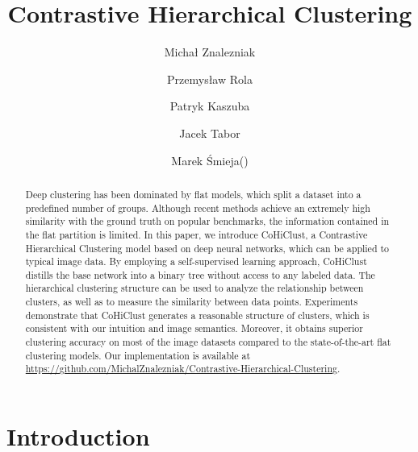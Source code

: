 \documentclass[runningheads]{llncs}
\def\our{CoHiClust}
\begin{document}
\title{Contrastive Hierarchical Clustering}




\author{Micha\l{} Znalezniak \and
Przemys\l{}aw Rola \and
Patryk Kaszuba \and 
Jacek Tabor \and
Marek Śmieja(\Letter)}
\maketitle              \begin{abstract}
Deep clustering has been dominated by flat models, which split a dataset into a predefined number of groups. Although recent methods achieve an extremely high similarity with the ground truth on popular benchmarks, the information contained in the flat partition is limited. In this paper, we introduce \our{}, a Contrastive Hierarchical Clustering model based on deep neural networks, which can be applied to typical image data. By employing a self-supervised learning approach, \our{} distills the base network into a binary tree without access to any labeled data. The hierarchical clustering structure can be used to analyze the relationship between clusters, as well as to measure the similarity between data points. Experiments demonstrate that \our{} generates a reasonable structure of clusters, which is consistent with our intuition and image semantics. Moreover, it obtains superior clustering accuracy on most of the image datasets compared to the state-of-the-art flat clustering models. Our implementation is available at \url{https://github.com/MichalZnalezniak/Contrastive-Hierarchical-Clustering}.

\end{abstract}


\section{Introduction}
\end{document}
